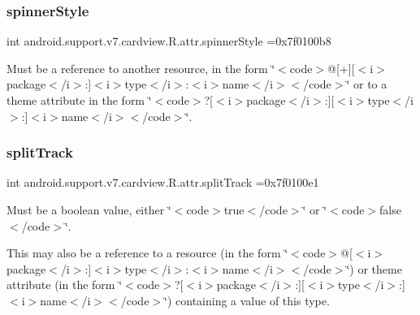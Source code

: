 \subsubsection{\texorpdfstring{spinner\+Style}{spinnerStyle}}
{\footnotesize\ttfamily int android.\+support.\+v7.\+cardview.\+R.\+attr.\+spinner\+Style =0x7f0100b8\hspace{0.3cm}{\ttfamily [static]}}

Must be a reference to another resource, in the form \char`\"{}$<$code$>$@\mbox{[}+\mbox{]}\mbox{[}$<$i$>$package$<$/i$>$\+:\mbox{]}$<$i$>$type$<$/i$>$\+:$<$i$>$name$<$/i$>$$<$/code$>$\char`\"{} or to a theme attribute in the form \char`\"{}$<$code$>$?\mbox{[}$<$i$>$package$<$/i$>$\+:\mbox{]}\mbox{[}$<$i$>$type$<$/i$>$\+:\mbox{]}$<$i$>$name$<$/i$>$$<$/code$>$\char`\"{}. \mbox{\label{classandroid_1_1support_1_1v7_1_1cardview_1_1R_1_1attr_aa85041f3a8ecbfff145615e0ac14f180}} 
\subsubsection{\texorpdfstring{split\+Track}{splitTrack}}
{\footnotesize\ttfamily int android.\+support.\+v7.\+cardview.\+R.\+attr.\+split\+Track =0x7f0100e1\hspace{0.3cm}{\ttfamily [static]}}

Must be a boolean value, either \char`\"{}$<$code$>$true$<$/code$>$\char`\"{} or \char`\"{}$<$code$>$false$<$/code$>$\char`\"{}. 

This may also be a reference to a resource (in the form \char`\"{}$<$code$>$@\mbox{[}$<$i$>$package$<$/i$>$\+:\mbox{]}$<$i$>$type$<$/i$>$\+:$<$i$>$name$<$/i$>$$<$/code$>$\char`\"{}) or theme attribute (in the form \char`\"{}$<$code$>$?\mbox{[}$<$i$>$package$<$/i$>$\+:\mbox{]}\mbox{[}$<$i$>$type$<$/i$>$\+:\mbox{]}$<$i$>$name$<$/i$>$$<$/code$>$\char`\"{}) containing a value of this type. \mbox{\label{classandroid_1_1support_1_1v7_1_1cardview_1_1R_1_1attr_ad0878331bfa33ef9e4e6672067245514}} 
